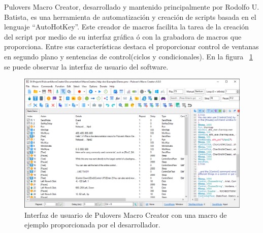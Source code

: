 
Pulover\textsc{}s Macro Creator\cite{Batista}, desarrollado y mantenido
 principalmente por Rodolfo U. Batista, es una herramienta de automatizaci\'on
 y creaci\'on de scripts basada en el lenguaje ``AutoHotKey''. Este creador de
 macros facilita la tarea de la creaci\'on del script por medio de su interfaz
 gr\'afica \'o con la grabadora de macros que proporciona. Entre sus
 caracter\'isticas destaca el proporcionar control de ventanas en segundo plano
 y sentencias de control(ciclos y condicionales). En la figura
 ~\ref{fig:macros} se puede observar la interfaz de usuario del software.


\begin{figure}[h]
\centering
\includegraphics[width=0.7\columnwidth]{chap2/Imagenes/Macros.eps}
\caption{Interfaz de usuario de Pulovers Macro Creator con una macro de
 ejemplo proporcionada por el desarrollador\cite{Batista}.}
\label{fig:macros}
\end{figure}